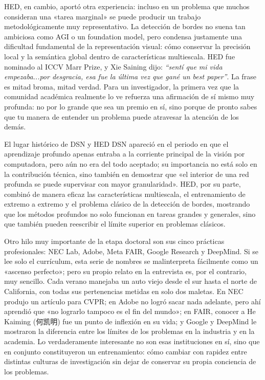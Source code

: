 \documentclass[a4paper,12pt]{article}
\begin{document}
HED, en cambio, aportó otra experiencia: incluso en un problema que muchos consideran una «tarea marginal» se puede producir un trabajo metodológicamente muy representativo. La detección de bordes no suena tan ambiciosa como AGI o un foundation model, pero condensa justamente una dificultad fundamental de la representación visual: cómo conservar la precisión local y la semántica global dentro de características multiescala. HED fue nominado al ICCV Marr Prize, y Xie Saining dijo: \textit{``sentí que mi vida empezaba...por desgracia, esa fue la última vez que gané un best paper''}. La frase es mitad broma, mitad verdad. Para un investigador, la primera vez que la comunidad académica realmente lo ve refuerza una afirmación de sí mismo muy profunda: no por lo grande que sea un premio en sí, sino porque de pronto sabes que tu manera de entender un problema puede atravesar la atención de los demás.

\begin{knowledgebox}{El lugar histórico de DSN y HED}
DSN apareció en el periodo en que el aprendizaje profundo apenas entraba a la corriente principal de la visión por computadora, pero aún no era del todo aceptado; su importancia no está solo en la contribución técnica, sino también en demostrar que «el interior de una red profunda se puede supervisar con mayor granularidad». HED, por su parte, combinó de manera eficaz las características multiescala, el entrenamiento de extremo a extremo y el problema clásico de la detección de bordes, mostrando que los métodos profundos no solo funcionan en tareas grandes y generales, sino que también pueden reescribir el límite superior en problemas clásicos.
\end{knowledgebox}

Otro hilo muy importante de la etapa doctoral son sus cinco prácticas profesionales: NEC Lab, Adobe, Meta FAIR, Google Research y DeepMind. Si se lee solo el currículum, esta serie de nombres se malinterpreta fácilmente como un «ascenso perfecto»; pero su propio relato en la entrevista es, por el contrario, muy sencillo. Cada verano manejaba un auto viejo desde el sur hasta el norte de California, con todas sus pertenencias metidas en solo dos maletas. En NEC produjo un artículo para CVPR; en Adobe no logró sacar nada adelante, pero ahí aprendió que «no lograrlo tampoco es el fin del mundo»; en FAIR, conocer a He Kaiming (何凯明) fue un punto de inflexión en su vida; y Google y DeepMind le mostraron la diferencia entre los límites de los problemas en la industria y en la academia. Lo verdaderamente interesante no son esas instituciones en sí, sino que en conjunto constituyeron un entrenamiento: cómo cambiar con rapidez entre distintas culturas de investigación sin dejar de conservar su propia conciencia de los problemas.
\end{document}
